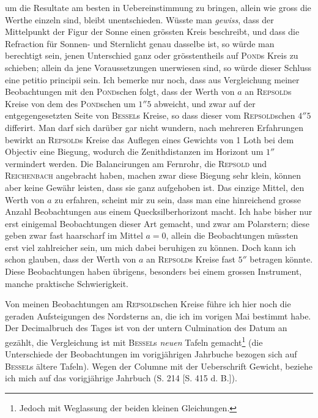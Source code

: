 um die Resultate am besten in Uebereinstimmung zu bringen, allein wie gross die Werthe einzeln sind,
bleibt unentschieden. Wüsste man \emph{gewiss}, dass der Mittelpunkt der Figur der Sonne einen
grössten Kreis beschreibt, und dass die Refraction für Sonnen- und Sternlicht genau dasselbe ist, so
würde man berechtigt sein, jenen Unterschied ganz oder grösstentheils auf \textsc{Pond}s Kreis
zu schieben; allein da jene Voraussetzungen unerwiesen sind, so würde dieser Schluss eine petitio
principii sein. Ich bemerke nur noch, dass aus Vergleichung meiner Beobachtungen mit den
\textsc{Pond}schen folgt, dass der Werth von $a$ an \textsc{Repsold}s Kreise von dem des
\textsc{Pond}schen um $1''5$ abweicht, und zwar auf der entgegengesetzten Seite von \textsc{Bessel}s
Kreise, so dass dieser vom \textsc{Repsold}schen $4''5$ differirt. Man darf sich darüber gar nicht
wundern, nach mehreren Erfahrungen bewirkt an \textsc{Repsold}s Kreise das Auflegen eines Gewichts
von 1 Loth bei dem Objectiv eine Biegung, wodurch die Zenithdistanzen im Horizont um $1''$ vermindert
werden. Die Balancirungen am Fernrohr, die \textsc{Repsold} und \textsc{Reichenbach} angebracht haben,
machen zwar diese Biegung sehr klein, können aber keine Gewähr leisten, dass sie ganz aufgehoben ist.
Das einzige Mittel, den Werth von $a$ zu erfahren, scheint mir zu sein, dass man eine hinreichend
grosse Anzahl Beobachtungen aus einem Quecksilberhorizont macht. Ich habe bisher nur erst einigemal
Beobachtungen dieser Art gemacht, und zwar am Polarstern; diese geben zwar fast haarscharf im Mittel
$a=0$, allein die Beobachtungen müssten erst viel zahlreicher sein, um mich dabei beruhigen zu
können. Doch kann ich schon glauben, dass der Werth von $a$ an \textsc{Repsold}s Kreise fast $5''$
betragen könnte. Diese Beobachtungen haben übrigens, besonders bei einem grossen Instrument, manche
praktische Schwierigkeit.

\par\indent Von meinen Beobachtungen am \textsc{Repsold}schen Kreise führe ich hier noch die geraden
Aufsteigungen des Nordsterns an, die ich im vorigen Mai bestimmt habe. Der Decimalbruch des Tages ist
von der untern Culmination des Datum an gezählt, 
die Vergleichung ist mit \textsc{Bessel}s \emph{neuen} Tafeln gemacht\footnote{Jedoch mit
Weglassung der beiden kleinen Gleichungen.} (die Unterschiede der Beobachtungen im vorigjährigen
Jahrbuche bezogen sich auf \textsc{Bessel}s ältere Tafeln). Wegen der Columne mit der Ueberschrift
Gewicht, beziehe ich mich auf das vorigjährige Jahrbuch (S. 214 [S. 415 d. B.]).

